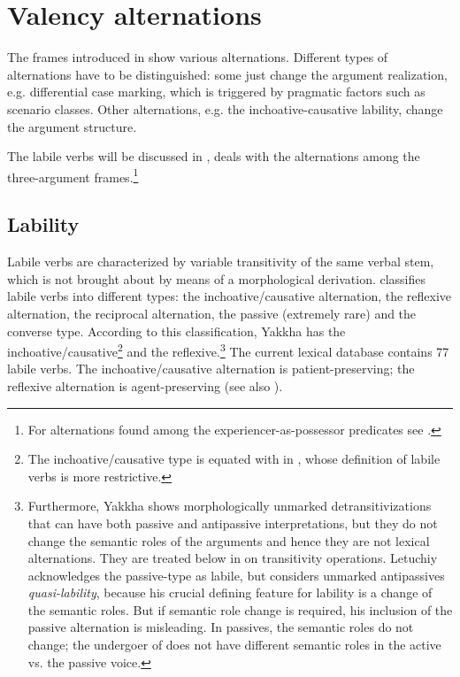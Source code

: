 \section{Valency alternations} \label{valclass}
 
The frames introduced in  show various alternations.  Different types of alternations have to be distinguished: some just change the argument realization, e.g. differential case marking, which is triggered by pragmatic factors such as  scenario classes. Other alternations, e.g. the inchoative-causative lability, change the argument structure. 

The  labile verbs will be discussed  in ,    deals with the alternations among the three-argument frames.\footnote{For alternations found among the experiencer-as-possessor predicates see .} 


\subsection{Lability}\label{labile}

Labile verbs are characterized by variable transitivity of the same verbal stem, which is not brought about by means of a morphological derivation. \citet[224]{Letuchiy2009Labile} classifies labile verbs  into different types: the inchoative/causative alternation, the reflexive alternation, the reciprocal alternation, the passive (extremely rare) and the converse type. According to this classification, Yakkha has the inchoative/causative\footnote{The inchoative/causative type is equated with  in \citet{Haspelmath1993More}, whose definition of labile verbs is more restrictive.} and the reflexive.\footnote{Furthermore, Yakkha shows morphologically unmarked detransitivizations that can have both passive and antipassive interpretations, but they do not change the semantic roles of the arguments and hence they are not lexical alternations. They are treated below in  on transitivity operations. Letuchiy acknowledges the passive-type as labile, but considers unmarked antipassives \emph{quasi-lability}, because his crucial defining feature for lability is a change of the semantic roles. But if semantic role change is required, his inclusion of the passive alternation is misleading. In passives, the semantic roles do not change; the undergoer of  does not have different semantic roles in the active vs. the passive voice.} The current lexical database contains 77 labile verbs. The inchoative/causative alternation is patient-preserving; the reflexive alternation is agent-preserving (see also \citealt[223]{Letuchiy2009Labile}). 

